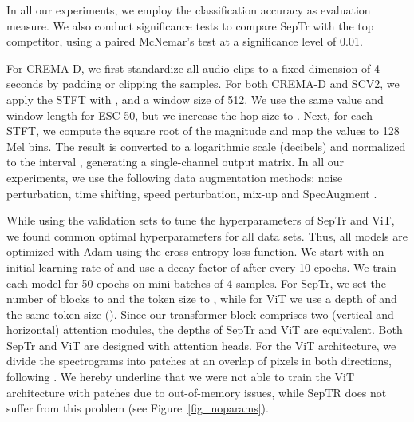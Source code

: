 \documentclass[a4paper]{article}
\begin{document}
In all our experiments, we employ the classification accuracy as evaluation measure. We also conduct significance tests to compare SepTr with the top competitor, using a paired McNemar's test \cite{Dietterich-NC-1998} at a significance level of 0.01.

For CREMA-D, we first standardize all audio clips to a fixed dimension of 4 seconds by padding or clipping the samples. For both CREMA-D and SCV2, we apply the STFT with ,  and a window size of 512. We use the same  value and window length for ESC-50, but we increase the hop size to . Next, for each STFT, we compute the square root of the magnitude and map the values to 128 Mel bins. The result is converted to a logarithmic scale (decibels) and normalized to the interval , generating a single-channel output matrix. In all our experiments, we use the following data augmentation methods: noise perturbation, time shifting, speed perturbation, mix-up and SpecAugment \cite{Park-INTERSPEECH-2019}.

While using the validation sets to tune the hyperparameters of SepTr and ViT, we found common optimal hyperparameters for all data sets. Thus, all models are optimized with Adam using the cross-entropy loss function. We start with an initial learning rate of  and use a decay factor of  after every 10 epochs. We train each model for 50 epochs on mini-batches of 4 samples. For SepTr, we set the number of blocks to  and the token size to , while for ViT we use a depth of  and the same token size (). Since our transformer block comprises two (vertical and horizontal) attention modules, the depths of SepTr and ViT are equivalent. Both SepTr and ViT are designed with  attention heads. For the ViT architecture, we divide the spectrograms into  patches at an overlap of  pixels in both directions, following \cite{Gong-INTERSPEECH-2021}. We hereby underline that we were not able to train the ViT architecture with  patches due to out-of-memory issues, while SepTR does not suffer from this problem (see Figure~\ref{fig_noparams}).
\end{document}
